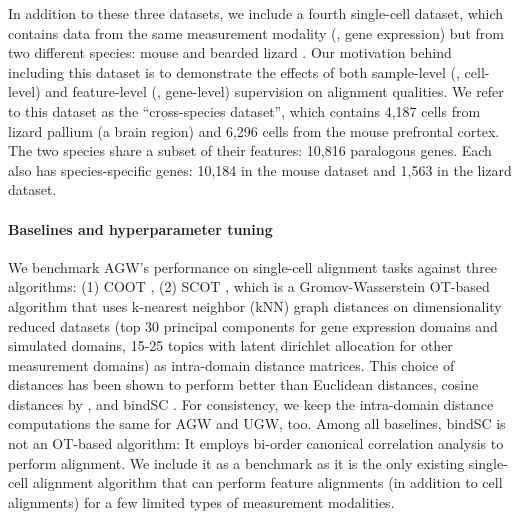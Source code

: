 In addition to these three datasets,
we include a fourth single-cell dataset, which contains data from the same measurement modality
(\ie, gene expression) but from two different species: mouse \citep{mouse} and
bearded lizard \citep{lizard}. Our motivation behind including this dataset is
to demonstrate the effects of both sample-level (\ie, cell-level) and
feature-level (\ie, gene-level) supervision on alignment qualities.
We refer to this dataset as the ``cross-species dataset'', which contains 4,187 cells
from lizard pallium (a brain region) and 6,296 cells from the mouse prefrontal cortex.
The two species share a subset of their features: 10,816 paralogous genes.
Each also has species-specific genes: 10,184 in the mouse dataset and 1,563 in the lizard dataset.

\paragraph{Baselines and hyperparameter tuning}
We benchmark AGW's performance on single-cell alignment tasks against three algorithms:
(1) COOT \citep{Redko20}, (2) SCOT \citep{Demetci20}, which is a Gromov-Wasserstein OT-based
algorithm that uses k-nearest neighbor (kNN) graph distances on dimensionality reduced datasets
(top 30 principal components for gene expression domains and simulated domains,
15-25 topics with latent dirichlet allocation for other measurement domains)
as intra-domain distance matrices. This choice of distances has been shown to perform
better than Euclidean distances, cosine distances by \citep{Demetci20}, and bindSC \citep{bindSC}.
For consistency, we keep the intra-domain distance computations the same for AGW and UGW, too.
Among all baselines, bindSC is not an OT-based algorithm: It employs bi-order canonical correlation
analysis to perform alignment. We include it as a benchmark as it is the only existing
single-cell alignment algorithm that can perform feature alignments (in addition to cell alignments)
for a few limited types of measurement modalities.

